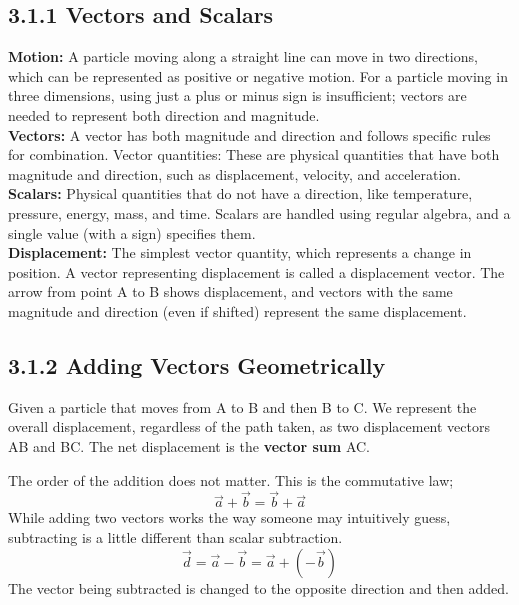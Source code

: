 \documentclass{article}
\begin{document}
\subsection*{3.1.1 Vectors and Scalars}
\textbf{Motion:}
	A particle moving along a straight line can move in two directions, which can be represented as positive or negative motion.
	For a particle moving in three dimensions, using just a plus or minus sign is insufficient; vectors are needed to represent both direction and magnitude.
\vspace{12pt}\\
\textbf{Vectors:}
    A vector has both magnitude and direction and follows specific rules for combination.
    Vector quantities: These are physical quantities that have both magnitude and direction, such as displacement, velocity, and acceleration.
\vspace{12pt}\\
\textbf{Scalars:}
    Physical quantities that do not have a direction, like temperature, pressure, energy, mass, and time.
    Scalars are handled using regular algebra, and a single value (with a sign) specifies them.
\vspace{12pt}\\
\textbf{Displacement:}
    The simplest vector quantity, which represents a change in position.
    A vector representing displacement is called a displacement vector.
    The arrow from point A to B shows displacement, and vectors with the same magnitude and direction (even if shifted) represent the same displacement.

\subsection*{3.1.2 Adding Vectors Geometrically}
Given a particle that moves from A to B and then B to C.
We represent the overall displacement, regardless of the path taken, as two displacement vectors AB and BC.
The net displacement is the \textbf{vector sum} AC.
\begin{center}
\end{center}
The order of the addition does not matter. This is the commutative law;
\[
	\vec{a} + \vec{b} = \vec{b} + \vec{a}
\]
While adding two vectors works the way someone may intuitively guess, subtracting is a little different than scalar subtraction.
\[
	\vec{d} = \vec{a} - \vec{b} = \vec{a} + (-\vec{b})
\]
The vector being subtracted is changed to the opposite direction and then added.
\end{document}
